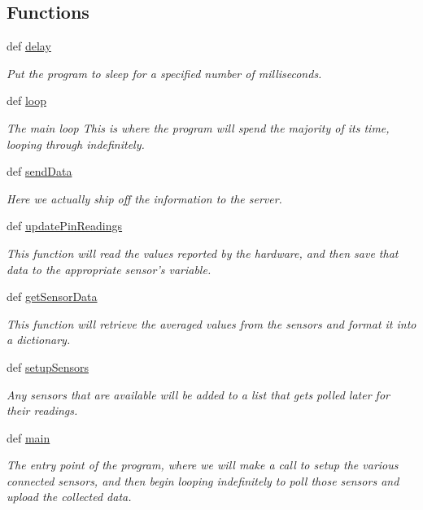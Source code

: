 \subsection*{Functions}
\begin{DoxyCompactItemize}
\item 
def \hyperlink{namespacesensing_a110922c2a80aabf038d162595e137cc4}{delay}
\begin{DoxyCompactList}\small\item\em Put the program to sleep for a specified number of milliseconds. \end{DoxyCompactList}\item 
def \hyperlink{namespacesensing_afc4f85f529614a384ee1d04cd5ff80f3}{loop}
\begin{DoxyCompactList}\small\item\em The main loop This is where the program will spend the majority of its time, looping through indefinitely. \end{DoxyCompactList}\item 
def \hyperlink{namespacesensing_aeae2450fef0f1a9244c1ddc6d96ef4c2}{send\-Data}
\begin{DoxyCompactList}\small\item\em Here we actually ship off the information to the server. \end{DoxyCompactList}\item 
def \hyperlink{namespacesensing_a75479ff0f15da4027d590f94160bb43f}{update\-Pin\-Readings}
\begin{DoxyCompactList}\small\item\em This function will read the values reported by the hardware, and then save that data to the appropriate sensor's variable. \end{DoxyCompactList}\item 
def \hyperlink{namespacesensing_af9472a5ce179d5f4cbbc2d02a9dbed14}{get\-Sensor\-Data}
\begin{DoxyCompactList}\small\item\em This function will retrieve the averaged values from the sensors and format it into a dictionary. \end{DoxyCompactList}\item 
def \hyperlink{namespacesensing_a3b1d400f9ad84146d60ee62f7e82faa0}{setup\-Sensors}
\begin{DoxyCompactList}\small\item\em Any sensors that are available will be added to a list that gets polled later for their readings. \end{DoxyCompactList}\item 
def \hyperlink{namespacesensing_a38d7f8a9b27bbcf471a89725a5e78493}{main}
\begin{DoxyCompactList}\small\item\em The entry point of the program, where we will make a call to setup the various connected sensors, and then begin looping indefinitely to poll those sensors and upload the collected data. \end{DoxyCompactList}\end{DoxyCompactItemize}

